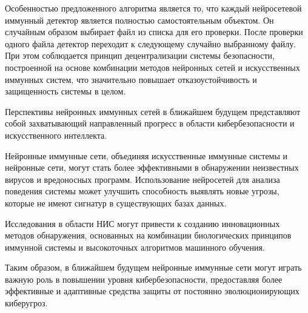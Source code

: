 \documentclass[bachelor, och, referat]{template}
\begin{document}
Особенностью предложенного алгоритма является то, что каждый
нейросетевой иммунный детектор является полностью самостоятельным
объектом. Он случайным образом выбирает файл из списка для его проверки. 
После проверки одного файла детектор переходит к следующему
случайно выбранному файлу. При этом соблюдается принцип децентрализации 
системы безопасности, построенной на основе комбинации мето­дов 
нейронных сетей и искусственных иммунных систем, что значительно
повышает отказоустойчивость и защищенность системы в целом.

\conclusion

Перспективы нейронных иммунных сетей в ближайшем будущем представляют 
собой захватывающий направленный прогресс в области кибербезопасности и 
искусственного интеллекта.

Нейронные иммунные сети, объединяя искусственные иммунные системы и нейронные сети, 
могут стать более эффективными в обнаружении неизвестных вирусов 
и вредоносных программ. Использование нейросетей для анализа поведения 
системы может улучшить способность выявлять новые угрозы, которые 
не имеют сигнатур в существующих базах данных.

Исследования в области НИС могут привести к созданию инновационных методов 
обнаружения, основанных на комбинации биологических принципов иммунной системы 
и высокоточных алгоритмов машинного обучения.

Таким образом, в ближайшем будущем нейронные иммунные сети могут играть 
важную роль в повышении уровня кибербезопасности, предоставляя более 
эффективные и адаптивные средства защиты от постоянно эволюционирующих 
киберугроз.
\end{document}
